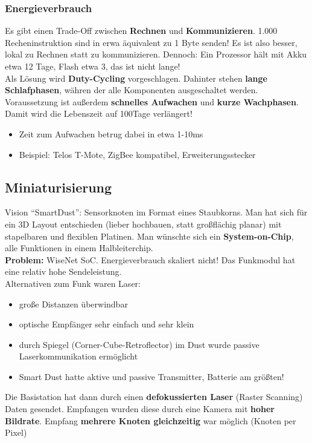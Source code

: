 \documentclass[a4paper]{article}
\begin{document}
\subsubsection{Energieverbrauch}
Es gibt einen Trade-Off zwischen \textbf{Rechnen} und \textbf{Kommunizieren}. 1.000 Recheninstruktion sind in erwa äquivalent zu 1 Byte senden! Es ist also besser, lokal zu Rechnen statt zu kommunizieren. Dennoch: Ein Prozessor hält mit Akku etwa 12 Tage, Flash etwa 3, das ist nicht lange!\\
Als Lösung wird \textbf{Duty-Cycling} vorgeschlagen. Dahinter stehen \textbf{lange Schlafphasen}, währen der alle Komponenten ausgeschaltet werden. Voraussetzung ist außerdem \textbf{schnelles Aufwachen} und \textbf{kurze Wachphasen}. Damit wird die Lebenszeit auf 100Tage verlängert!\\
\begin{itemize}
	\item Zeit zum Aufwachen betrug dabei in etwa 1-10ms
	\item Beispiel: Telos T-Mote, ZigBee kompatibel, Erweiterungsstecker
\end{itemize}

\subsection{Miniaturisierung}
Vision ``SmartDust'': Sensorknoten im Format eines Staubkorns. Man hat sich für ein 3D Layout entschieden (lieber hochbauen, statt großflächig planar) mit stapelbaren und flexiblen Platinen. Man wünschte sich ein \textbf{System-on-Chip}, alle Funktionen in einem Halbleiterchip.\\
\textbf{Problem:} WiseNet SoC. Energieverbrauch skaliert nicht! Das Funkmodul hat eine relativ hohe Sendeleistung.\\
Alternativen zum Funk waren Laser:
\begin{itemize}
	\item große Distanzen überwindbar
	\item optische Empfänger sehr einfach und sehr klein
	\item durch Spiegel (Corner-Cube-Retroflector) im Dust wurde passive Laserkommunikation ermöglicht
	\item Smart Dust hatte aktive und passive Transmitter, Batterie am größten!
\end{itemize}
Die Basistation hat dann durch einen \textbf{defokussierten Laser} (Raster Scanning) Daten gesendet. Empfangen wurden diese durch eine Kamera mit \textbf{hoher Bildrate}. Empfang \textbf{mehrere Knoten gleichzeitig} war möglich (Knoten per Pixel)\\
\\
\end{document}

